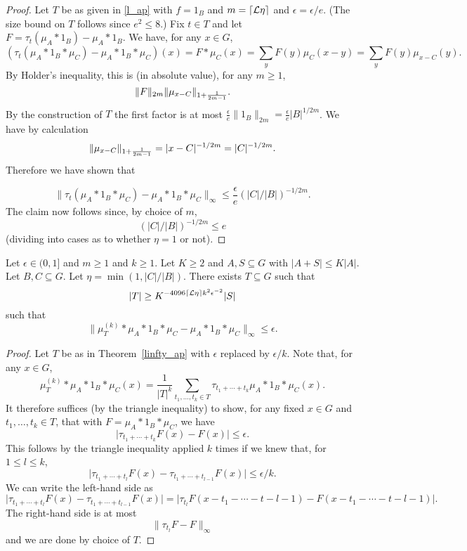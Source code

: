 \begin{proof}
 Let $T$ be as given in \ref{l_ap}
with $f=1_B$ and $m=\lceil \mathcal{L}{\eta}\rceil$ and $\epsilon=\epsilon/e$. (The size bound on $T$ follows since $e^2\leq 8$.) Fix $t\in T$ and let $F=\tau_t(\mu_A\ast 1_B)-\mu_A\ast 1_B$. We have, for any $x\in G$,
\[(\tau_t(\mu_A\ast 1_B\ast \mu_C)-\mu_A\ast 1_B\ast \mu_C)(x)=F\ast \mu_C(x)=\sum_y F(y)\mu_{C}(x-y)=\sum_yF(y)\mu_{x-C}(y).\]
By Holder's inequality, this is (in absolute value), for any $m\geq 1$,
\[\lVert F\rVert_{2m}\lVert \mu_{x-C}\rVert_{1+\frac{1}{2m-1}}.\]
By the construction of $T$ the first factor is at most
$\frac{\epsilon}{e}\| 1_B\|_{2m}=\frac{\epsilon}{e}\lvert B\rvert^{1/2m}$.
We have by calculation
\[\lVert \mu_{x-C}\rVert_{1+\frac{1}{2m-1}}=\lvert x-C\rvert^{-1/2m}=\lvert C\rvert^{-1/2m}.\]
Therefore we have shown that

\[\| \tau_t(\mu_A\ast 1_B\ast \mu_C)-\mu_A\ast 1_B\ast \mu_C\|_{\infty}\leq \frac{\epsilon}{e}(\lvert C\rvert/\lvert B\rvert)^{-1/2m}.\]
The claim now follows since, by choice of $m$,
\[(\lvert C\rvert/\lvert B\rvert)^{-1/2m}\leq e\]
(dividing into cases as to whether $\eta=1$ or not).
\end{proof}


\begin{theorem}
\label{linfty_ap_boosted}

Let $\epsilon\in (0,1]$ and $m\geq 1$ and $k\geq 1$. Let $K\geq 2$ and $A,S\subseteq G$ with $\lvert A+S\rvert\leq K\lvert A\rvert$.
Let $B,C\subseteq G$. Let $\eta=\min(1,\lvert C\rvert/\lvert B\rvert)$. There exists $T\subseteq G$ such that
\[\lvert T\rvert \geq K^{-4096\lceil \mathcal{L}{\eta}\rceil k^2\epsilon^{-2}}\lvert S\rvert\]
such that
\[\| \mu_T^{(k)}\ast \mu_A\ast 1_B\ast \mu_C-\mu_A\ast 1_B\ast \mu_C\|_{\infty}\leq \epsilon.\]
\end{theorem}

\begin{proof}
Let $T$ be as in Theorem~\ref{linfty_ap} with $\epsilon$ replaced by $\epsilon/k$. Note that, for any $x\in G$,
\[\mu_T^{(k)}\ast \mu_A\ast 1_B\ast \mu_C(x)=\frac{1}{\lvert T\rvert^k}\sum_{t_1,\ldots,t_k\in T}\tau_{t_1+\cdots+t_k}\mu_A\ast 1_B\ast \mu_C(x).\]
It therefore suffices (by the triangle inequality) to show, for any fixed $x\in G$ and $t_1,\ldots,t_k\in T$, that with $F=\mu_A\ast 1_B\ast \mu_C$, we have
\[\lvert \tau_{t_1+\cdots+t_k}F(x)-F(x)\rvert \leq \epsilon.\]
This follows by the triangle inequality applied $k$ times if we knew that, for $1\leq l\leq k$,
\[\lvert \tau_{t_1+\cdots+t_l}F(x)-\tau_{t_1+\cdots+t_{l-1}}F(x)\rvert \leq \epsilon/k.\]
We can write the left-hand side as
\[\lvert \tau_{t_1+\cdots+t_l}F(x)-\tau_{t_1+\cdots+t_{l-1}}F(x)\rvert=\lvert \tau_{t_l}F(x-t_1-\cdots-t-{l-1})-F(x-t_1-\cdots-t-{l-1})\rvert.\]
The right-hand side is at most
\[\| \tau_{t_l}F-F\|_\infty\]
and we are done by choice of $T$.
\end{proof}

